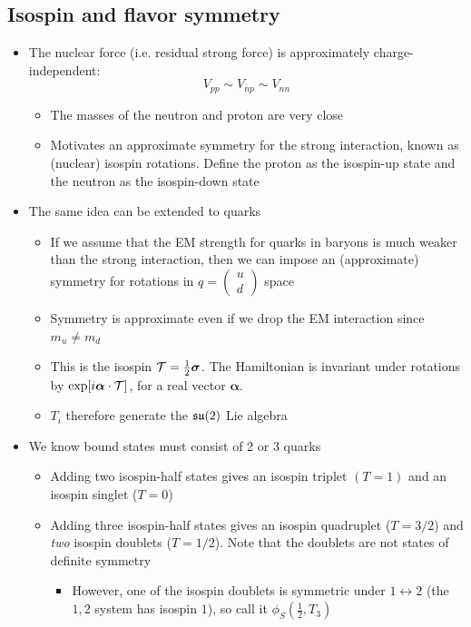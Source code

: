 \subsection{Isospin and flavor symmetry}
\begin{itemize}
  \item The nuclear force (i.e. residual strong force) is approximately charge-independent:
  \begin{equation}
    V_{pp} \sim V_{np} \sim V_{nn}
  \end{equation}
  \begin{itemize}
    \item The masses of the neutron and proton are very close
    \item Motivates an approximate symmetry for the strong interaction, known as (nuclear) isospin rotations. Define the proton as the isospin-up state and the neutron as the isospin-down state
  \end{itemize}
  \item The same idea can be extended to quarks
  \begin{itemize}
    \item If we assume that the EM strength for quarks in baryons is much weaker than the strong interaction, then we can impose an (approximate) symmetry for rotations in $q = \begin{pmatrix} u \\ d \end{pmatrix}$ space
    \item Symmetry is approximate even if we drop the EM interaction since $m_u\neq m_d$
    \item This is the isospin $\mathcal{T} = \frac{1}{2}\bm\sigma$. The Hamiltonian is invariant under rotations by $\exp[i\bm\alpha\cdot\mathcal{T}]$, for a real vector $\bm\alpha$. 
    \item $T_i$ therefore generate the $\operatorname{\mathfrak{su}}(2)$ Lie algebra
  \end{itemize}
  \item We know bound states must consist of 2 or 3 quarks
  \begin{itemize}
    \item Adding two isospin-half states gives an isospin triplet $(T=1)$ and an isospin singlet ($T=0$)
    \item Adding three isospin-half states gives an isospin quadruplet ($T=3/2$) and \emph{two} isospin doublets ($T=1/2$). Note that the doublets are not states of definite symmetry
    \begin{itemize}
      \item However, one of the isospin doublets is symmetric under $1\leftrightarrow2$ (the $1,2$ system has isospin $1$), so call it $\phi_S\left(\frac{1}{2},T_3\right)$

\end{itemize}
\end{itemize}
\end{itemize}
